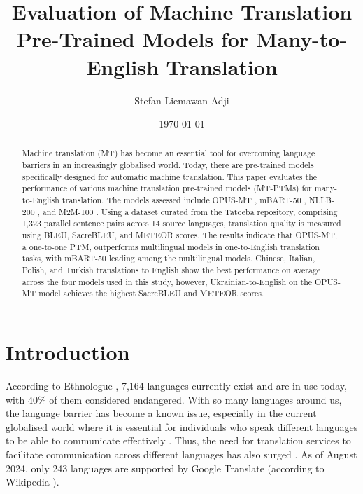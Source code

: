 \documentclass[a4paper, 11pt]{article}
\title{Evaluation of Machine Translation Pre-Trained Models for Many-to-English Translation}
\author{Stefan Liemawan Adji}
\date{\today}
\begin{document}
\maketitle


\begin{abstract}
    Machine translation (MT) has become an essential tool for overcoming language barriers in an increasingly globalised world. Today, there are pre-trained models specifically designed for automatic machine translation. This paper evaluates the performance of various machine translation pre-trained models (MT-PTMs) for many-to-English translation. The models assessed include OPUS-MT \cite{tiedemann-2020-opus-mt}, mBART-50 \cite{liu-2020-mbart}, NLLB-200 \cite{nllb200-2020}, and M2M-100 \cite{fan-2020-m2m100}. Using a dataset curated from the Tatoeba repository, comprising 1,323 parallel sentence pairs across 14 source languages, translation quality is measured using BLEU, SacreBLEU, and METEOR scores. The results indicate that OPUS-MT, a one-to-one PTM, outperforms multilingual models in one-to-English translation tasks, with mBART-50 leading among the multilingual models. Chinese, Italian, Polish, and Turkish translations to English show the best performance on average across the four models used in this study, however, Ukrainian-to-English on the OPUS-MT model achieves the highest SacreBLEU and METEOR scores.
\end{abstract}

\section{Introduction}

According to Ethnologue \cite{ethnologue-2024}, 7,164 languages currently exist and are in use today, with 40\% of them considered endangered. With so many languages around us, the language barrier has become a known issue, especially in the current globalised world where it is essential for individuals who speak different languages to be able to communicate effectively \cite{nakamura-2009-overcoming}. Thus, the need for translation services to facilitate communication across different languages has also surged \cite{okpor-2014-machine-ta}. As of August 2024, only 243 languages are supported by Google Translate (according to Wikipedia \cite{wikipedia-google-translate}).
\end{document}
